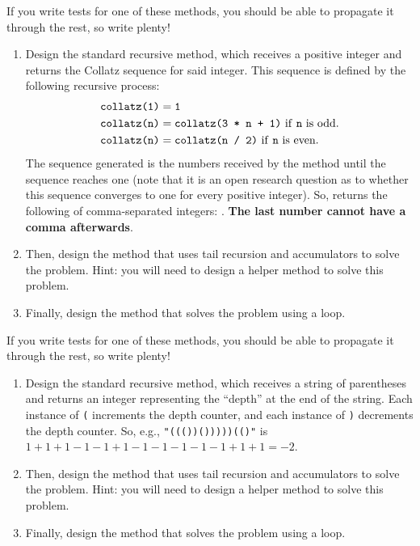 If you write tests for one of these methods, you should be able to propagate it through the rest, so write plenty!

\begin{enumerate}[label=(\alph*)]
\item Design the standard recursive  method, which receives a positive integer and returns the Collatz sequence for said integer. This sequence is defined by the following recursive process:
\begin{align*}
    \ttt{collatz(1)} &= \ttt{1}\\
    \ttt{collatz(n)} &= \ttt{collatz(3 * n + 1)} \text{ if \ttt{n} is odd.}\\
    \ttt{collatz(n)} &= \ttt{collatz(n / 2)} \text{ if \ttt{n} is even.}
\end{align*}
The sequence generated is the numbers received by the method until the sequence reaches one (note that it is an open research question as to whether this sequence converges to one for every positive integer). So,  returns the following  of comma-separated integers: . \textbf{The last number cannot have a comma afterwards}.

\item Then, design the  method that uses tail recursion and accumulators to solve the problem. Hint: you will need to design a  helper method to solve this problem.

\item Finally, design the  method that solves the problem using a loop.
\end{enumerate}

If you write tests for one of these methods, you should be able to propagate it through the rest, so write plenty!

\begin{enumerate}[label=(\alph*)]
\item Design the standard recursive  method, which receives a string of parentheses and returns an integer representing the ``depth'' at the end of the string. Each instance of \texttt{(} increments the depth counter, and each instance of \texttt{)} decrements the depth counter. So, e.g., \texttt{"((())()))))(()"} is $1+1+1-1-1+1-1-1-1-1-1+1+1=-2$.

\item Then, design the  method that uses tail recursion and accumulators to solve the problem. Hint: you will need to design a  helper method to solve this problem.

\item Finally, design the  method that solves the problem using a loop.
\end{enumerate}

